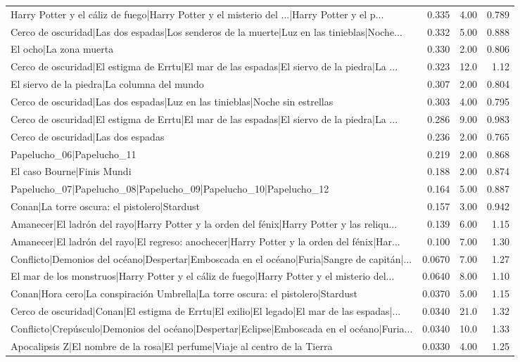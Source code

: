 \begin{table}[htbp]
\begin{tabular}{lrrr}
Harry Potter y el cáliz de fuego|Harry Potter y el misterio del ...|Harry Potter y el p... & 0.335 & 4.00 & 0.789 \\
Cerco de oscuridad|Las dos espadas|Los senderos de la muerte|Luz en las tinieblas|Noche... & 0.332 & 5.00 & 0.888 \\
El ocho|La zona muerta & 0.330 & 2.00 & 0.806 \\
Cerco de oscuridad|El estigma de Errtu|El mar de las espadas|El siervo de la piedra|La ... & 0.323 & 12.0 & 1.12 \\
El siervo de la piedra|La columna del mundo & 0.307 & 2.00 & 0.804 \\
Cerco de oscuridad|Las dos espadas|Luz en las tinieblas|Noche sin estrellas & 0.303 & 4.00 & 0.795 \\
Cerco de oscuridad|El estigma de Errtu|El mar de las espadas|El siervo de la piedra|La ... & 0.286 & 9.00 & 0.983 \\
Cerco de oscuridad|Las dos espadas & 0.236 & 2.00 & 0.765 \\
Papelucho\_06|Papelucho\_11 & 0.219 & 2.00 & 0.868 \\
El caso Bourne|Finis Mundi & 0.188 & 2.00 & 0.874 \\
Papelucho\_07|Papelucho\_08|Papelucho\_09|Papelucho\_10|Papelucho\_12 & 0.164 & 5.00 & 0.887 \\
Conan|La torre oscura: el pistolero|Stardust & 0.157 & 3.00 & 0.942 \\
Amanecer|El ladrón del rayo|Harry Potter y la orden del fénix|Harry Potter y las reliqu... & 0.139 & 6.00 & 1.15 \\
Amanecer|El ladrón del rayo|El regreso: anochecer|Harry Potter y la orden del fénix|Har... & 0.100 & 7.00 & 1.30 \\
Conflicto|Demonios del océano|Despertar|Emboscada en el océano|Furia|Sangre de capitán|... & 0.0670 & 7.00 & 1.27 \\
El mar de los monstruos|Harry Potter y el cáliz de fuego|Harry Potter y el misterio del... & 0.0640 & 8.00 & 1.10 \\
Conan|Hora cero|La conspiración Umbrella|La torre oscura: el pistolero|Stardust & 0.0370 & 5.00 & 1.15 \\
Cerco de oscuridad|Conan|El estigma de Errtu|El exilio|El legado|El mar de las espadas|... & 0.0340 & 21.0 & 1.32 \\
Conflicto|Crepúsculo|Demonios del océano|Despertar|Eclipse|Emboscada en el océano|Furia... & 0.0340 & 10.0 & 1.33 \\
Apocalipsis Z|El nombre de la rosa|El perfume|Viaje al centro de la Tierra & 0.0330 & 4.00 & 1.25 \\

\end{tabular}
\end{table}
